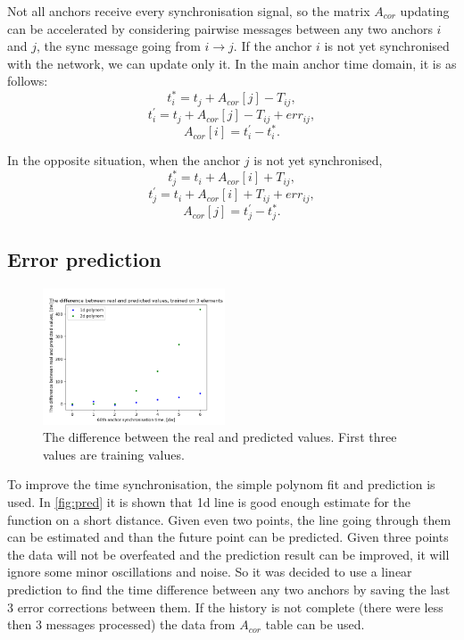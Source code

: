 \documentclass[journal]{IEEEtran}
\begin{document}
Not all anchors receive every synchronisation signal, so the matrix $A_{cor}$ updating can be accelerated by considering pairwise messages between any two anchors $i$ and $j$, the sync message going from $i \rightarrow j$. If the anchor $i$ is not yet synchronised with the network, we can update only it. In the main anchor time domain, it is as follows:
\begin{equation}
    t_i^{*} = t_j + A_{cor}[j] - T_{ij},
\end{equation}
\begin{equation}
    t_i^{'} = t_j + A_{cor}[j] - T_{ij} + err_{ij},
\end{equation}
\begin{equation}
    A_{cor}[i] = t_i^{'} - t_i^{*}.
\end{equation}

In the opposite situation, when the anchor $j$ is not yet synchronised,
\begin{equation}
    t_j^{*} = t_i + A_{cor}[i] + T_{ij},
\end{equation}
\begin{equation}
    t_j^{'} = t_i + A_{cor}[i] + T_{ij} + err_{ij},
\end{equation}
\begin{equation}
    A_{cor}[j] = t_j^{'} - t_j^{*}.
\end{equation}

\subsection{Error prediction}
\begin{figure}[ht]
    \centering
    \includegraphics[width=0.48\textwidth]{graphics/68_prediction.png}
    \caption{The difference between the real and predicted values. First three values are training values.}
    \label{fig:pred}
\end{figure}
To improve the time synchronisation, the simple polynom fit and prediction is used. 
In \autoref{fig:pred} it is shown that 1d line is good enough estimate for the function on a short distance.
Given even two points, the line going through them can be estimated and than the future point can be predicted.
Given three points the data will not be overfeated and the prediction result can be improved, it will ignore some minor oscillations and noise.
So it was decided to use a linear prediction to find the time difference between any two anchors by saving the last 3 error corrections between them.
If the history is not complete (there were less then 3 messages processed) the data from $A_{cor}$ table can be used.
\end{document}
